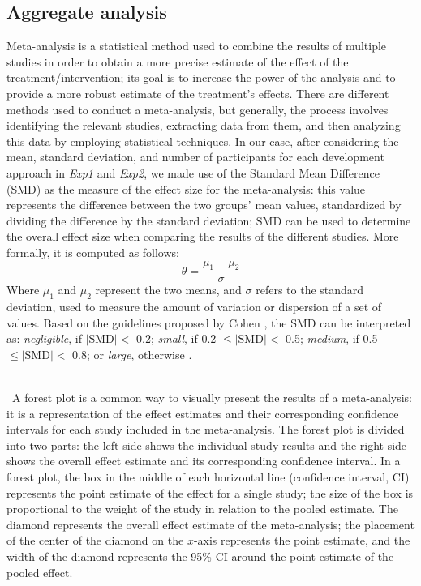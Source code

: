 \subsection{Aggregate analysis}
Meta-analysis is a statistical method used to combine the results of multiple studies in order to obtain a more precise estimate of the effect of the treatment/intervention; its goal is to increase the power of the analysis and to provide a more robust estimate of the treatment's effects.
There are different methods used to conduct a meta-analysis, but generally, the process involves identifying the relevant studies, extracting data from them, and then analyzing this data by employing statistical techniques. 
In our case, after considering the mean, standard deviation, and number of participants for each development approach in \textit{Exp1} and \textit{Exp2}, we made use of the Standard Mean Difference (SMD) as the measure of the effect size for the meta-analysis: this value represents the difference between the two groups' mean values, standardized by dividing the difference by the standard deviation; SMD can be used to determine the overall effect size when comparing the results of the different studies. More formally, it is computed as follows:
\[
    \theta = \frac{\mu_1 - \mu_2}{\sigma}
\]
Where $\mu_1$ and $\mu_2$ represent the two means, and $\sigma$ refers to the standard deviation, used to measure the amount of variation or dispersion of a set of values.
\noindent Based on the guidelines proposed by Cohen \cite{Cohen:1992}, the SMD can be interpreted as: \textit{negligible}, if $|\text{SMD}| <$ 0.2; \textit{small}, if 0.2 $\le |\text{SMD}| <$ 0.5; \textit{medium}, if 0.5 $\le |\text{SMD}| <$ 0.8; or \textit{large}, otherwise \cite{DBLP:conf/esem/RomanoZBPS22}.

\ \\ \
A forest plot is a common way to visually present the results of a meta-analysis: it is a representation of the effect estimates and their corresponding confidence intervals for each study included in the meta-analysis. The forest plot is divided into two parts: the left side shows the individual study results and the right side shows the overall effect estimate and its corresponding confidence interval.
In a forest plot, the box in the middle of each horizontal line (confidence interval, CI) represents the point estimate of the effect for a single study; the size of the box is proportional to the weight of the study in relation to the pooled estimate. The diamond represents the overall effect estimate of the meta-analysis; the placement of the center of the diamond on the $x$-axis represents the point estimate, and the width of the diamond represents the 95\% CI around the point estimate of the pooled effect.



